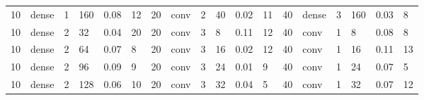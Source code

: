 \begin{table}
{\begin{tabular}{@{}llllll|llllll|llllll@{}}
10                              & dense                          & 1                              & 160                            & 0.08                             & 12                                & 20                              & conv                           & 2                              & 40                             & 0.02                           & 11                                & 40                              & dense                          & 3                              & 160                            & 0.03                           & 8                                \\
10                              & dense                          & 2                              & 32                             & 0.04                             & 20                                & 20                              & conv                           & 3                              & 8                              & 0.11                           & 12                                & 40                              & conv                           & 1                              & 8                              & 0.08                           & 8                                \\
10                              & dense                          & 2                              & 64                             & 0.07                             & 8                                 & 20                              & conv                           & 3                              & 16                             & 0.02                           & 12                                & 40                              & conv                           & 1                              & 16                             & 0.11                           & 13                               \\
10                              & dense                          & 2                              & 96                             & 0.09                             & 9                                 & 20                              & conv                           & 3                              & 24                             & 0.01                           & 9                                 & 40                              & conv                           & 1                              & 24                             & 0.07                           & 5                                \\
10                              & dense                          & 2                              & 128                            & 0.06                             & 10                                & 20                              & conv                           & 3                              & 32                             & 0.04                           & 5                                 & 40                              & conv                           & 1                              & 32                             & 0.07                           & 12                               \\

\end{tabular}}
\end{table}
